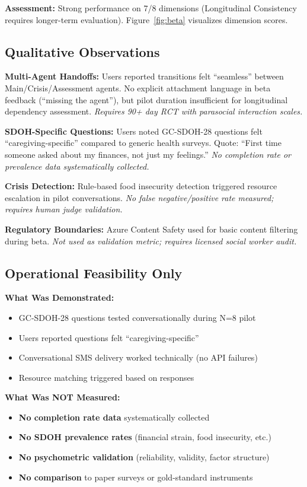 \documentclass{article}
\begin{document}
\textbf{Assessment:} Strong performance on 7/8 dimensions (Longitudinal Consistency requires longer-term evaluation). Figure~\ref{fig:beta} visualizes dimension scores.

%
\subsection{Qualitative Observations}%
\label{subsec:FailureModePreventionEvidence}%
\textbf{Multi-Agent Handoffs:} Users reported transitions felt ``seamless'' between Main/Crisis/Assessment agents. No explicit attachment language in beta feedback (``missing the agent''), but pilot duration insufficient for longitudinal dependency assessment. \textit{Requires 90+ day RCT with parasocial interaction scales.}

\textbf{SDOH-Specific Questions:} Users noted GC-SDOH-28 questions felt ``caregiving-specific'' compared to generic health surveys. Quote: ``First time someone asked about my finances, not just my feelings.'' \textit{No completion rate or prevalence data systematically collected.}

\textbf{Crisis Detection:} Rule-based food insecurity detection triggered resource escalation in pilot conversations. \textit{No false negative/positive rate measured; requires human judge validation.}

\textbf{Regulatory Boundaries:} Azure Content Safety used for basic content filtering during beta. \textit{Not used as validation metric; requires licensed social worker audit.}

%
\subsection{Operational Feasibility Only}%
\label{subsec:GC{-}SDOH{-}28PerformanceandPrevalence}%
\textbf{What Was Demonstrated:}
\begin{itemize}
    \item GC-SDOH-28 questions tested conversationally during N=8 pilot
    \item Users reported questions felt ``caregiving-specific''
    \item Conversational SMS delivery worked technically (no API failures)
    \item Resource matching triggered based on responses
\end{itemize}

\textbf{What Was NOT Measured:}
\begin{itemize}
    \item \textbf{No completion rate data} systematically collected
    \item \textbf{No SDOH prevalence rates} (financial strain, food insecurity, etc.)
    \item \textbf{No psychometric validation} (reliability, validity, factor structure)
    \item \textbf{No comparison} to paper surveys or gold-standard instruments
\end{itemize}
\end{document}

